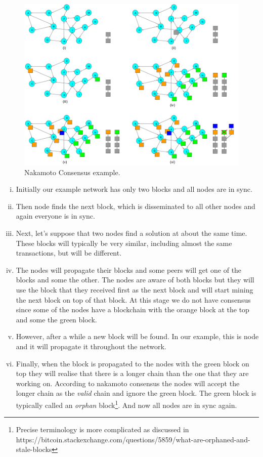 \begin{figure}[h]
\begin{center}
\includegraphics[scale=0.4]{images/nakamoto-consensus}
\caption{Nakamoto Consensus example.}
\label{fig:nakamoto-consensus}
\end{center}
\end{figure}

\begin{enumerate}[(i)]
\item Initially our example network has only two blocks and all nodes are in sync.
\item Then node  finds the next block, which is disseminated to all other nodes and again everyone is in sync.
\item Next, let's suppose that two nodes find a solution at about the same time. These blocks will typically be very similar, including almost the same transactions, but will be different.
\item The nodes will propagate their blocks and some peers will get one of the blocks and some the other. The nodes are aware of both blocks but they will use the block that they received first as the next block and will start mining the next block on top of that block. At this stage we do not have consensus since some of the nodes have a blockchain with the orange block at the top and some the green block.
\item However, after a while a new block will be found. In our example, this is node  and it will propagate it throughout the network.
\item Finally, when the block is propagated to the nodes with the green block on top they will realise that there is a longer chain than the one that they are working on. According to nakamoto consensus the nodes will accept the longer chain as the \emph{valid} chain and ignore the green block. The green block is typically called an \emph{orphan} block\footnote{Precise terminology is more complicated as discussed in https://bitcoin.stackexchange.com/questions/5859/what-are-orphaned-and-stale-blocks}. And now all nodes are in sync again. 
\end{enumerate}

